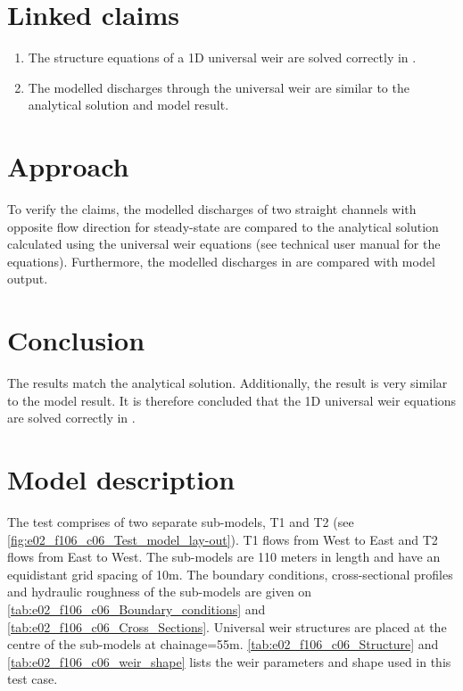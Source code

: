 \section*{Linked claims}
\begin{enumerate}
\item The structure equations of a 1D universal weir are solved correctly in \dflowfmfull.
\item The modelled discharges through the universal weir are similar to the analytical solution and \sobekthree model result.
\end{enumerate}

\section*{Approach}
To verify the claims, the modelled discharges of two straight channels with opposite flow direction for steady-state are compared to the analytical solution calculated using the universal weir equations (see \dflowfm technical user manual for the equations). 
Furthermore, the modelled discharges in \dflowfm are compared with \sobekthree model output.

\section*{Conclusion} 
The \dflowfm results match the analytical solution. Additionally, the \dflowfm result is very similar to the \sobekthree model result.
It is therefore concluded that the 1D universal weir equations are solved correctly in \dflowfm.

\section*{Model description}
The test comprises of two separate sub-models, T1 and T2 (see \autoref{fig:e02_f106_c06_Test_model_lay-out}). 
T1 flows from West to East and T2 flows from East to West.
The sub-models are 110 meters in length and have an equidistant grid spacing of 10m. 
The boundary conditions, cross-sectional profiles and hydraulic roughness of the sub-models are given on \autoref{tab:e02_f106_c06_Boundary_conditions} and \autoref{tab:e02_f106_c06_Cross_Sections}.
Universal weir structures are placed at the centre of the sub-models at chainage=55m.
\autoref{tab:e02_f106_c06_Structure} and \autoref{tab:e02_f106_c06_weir_shape} lists the weir parameters and shape used in this test case.

